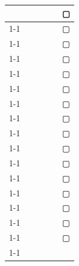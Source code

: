 \documentclass[paper=a4, fontsize=10bp]{jlreq}
\begin{document}
\begin{table}[H]
\begin{minipage}[h]{0.5\linewidth}
\begin{tabular}{cccccc}
            \multicolumn{1}{|c|}{} & & \multicolumn{1}{|c|}{} & & \multicolumn{1}{|c|}{} & ▢  \\ \cline{1-1} \cline{3-3} \cline{5-5}
            \multicolumn{1}{|c|}{} & & \multicolumn{1}{|c|}{} & & \multicolumn{1}{|c|}{} & ▢  \\ \cline{1-1} \cline{3-3} \cline{5-5}
            \multicolumn{1}{|c|}{} & & \multicolumn{1}{|c|}{} & & \multicolumn{1}{|c|}{} & ▢  \\ \cline{1-1} \cline{3-3} \cline{5-5}
            \multicolumn{1}{|c|}{} & & \multicolumn{1}{|c|}{} & & \multicolumn{1}{|c|}{} & ▢  \\ \cline{1-1} \cline{3-3} \cline{5-5}
            \multicolumn{1}{|c|}{} & & \multicolumn{1}{|c|}{} & & \multicolumn{1}{|c|}{} & ▢  \\ \cline{1-1} \cline{3-3} \cline{5-5}
            \multicolumn{1}{|c|}{} & & \multicolumn{1}{|c|}{} & & \multicolumn{1}{|c|}{} & ▢  \\ \cline{1-1} \cline{3-3} \cline{5-5}
            \multicolumn{1}{|c|}{} & & \multicolumn{1}{|c|}{} & & \multicolumn{1}{|c|}{} & ▢  \\ \cline{1-1} \cline{3-3} \cline{5-5}
            \multicolumn{1}{|c|}{} & & \multicolumn{1}{|c|}{} & & \multicolumn{1}{|c|}{} & ▢  \\ \cline{1-1} \cline{3-3} \cline{5-5}
            \multicolumn{1}{|c|}{} & & \multicolumn{1}{|c|}{} & & \multicolumn{1}{|c|}{} & ▢  \\ \cline{1-1} \cline{3-3} \cline{5-5}
            \multicolumn{1}{|c|}{} & & \multicolumn{1}{|c|}{} & & \multicolumn{1}{|c|}{} & ▢  \\ \cline{1-1} \cline{3-3} \cline{5-5}
            \multicolumn{1}{|c|}{} & & \multicolumn{1}{|c|}{} & & \multicolumn{1}{|c|}{} & ▢  \\ \cline{1-1} \cline{3-3} \cline{5-5}
            \multicolumn{1}{|c|}{} & & \multicolumn{1}{|c|}{} & & \multicolumn{1}{|c|}{} & ▢  \\ \cline{1-1} \cline{3-3} \cline{5-5}
            \multicolumn{1}{|c|}{} & & \multicolumn{1}{|c|}{} & & \multicolumn{1}{|c|}{} & ▢  \\ \cline{1-1} \cline{3-3} \cline{5-5}
            \multicolumn{1}{|c|}{} & & \multicolumn{1}{|c|}{} & & \multicolumn{1}{|c|}{} & ▢  \\ \cline{1-1} \cline{3-3} \cline{5-5}
            \multicolumn{1}{|c|}{} & & \multicolumn{1}{|c|}{} & & \multicolumn{1}{|c|}{} & ▢  \\ \cline{1-1} \cline{3-3} \cline{5-5}
            \multicolumn{1}{|c|}{} & & \multicolumn{1}{|c|}{} & & \multicolumn{1}{|c|}{} & ▢  \\ \cline{1-1} \cline{3-3} \cline{5-5}

\end{tabular}
\end{minipage}
\end{table}
\end{document}
